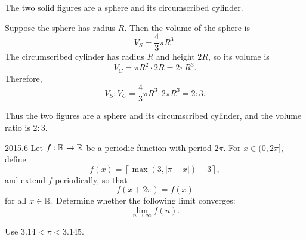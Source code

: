     \begin{solution}
        The two solid figures are a sphere and its circumscribed cylinder.

        Suppose the sphere has radius $R$. Then the volume of the sphere is
        \[
            V_S=\frac{4}{3}\pi R^3.
        \]
        The circumscribed cylinder has radius $R$ and height $2R$, so its volume is
        \[
            V_C=\pi R^2\cdot 2R=2\pi R^3.
        \]
        Therefore,
        \[
            V_S:V_C
            =
            \frac{4}{3}\pi R^3:2\pi R^3
            =
            2:3.
        \]

        Thus the two figures are a sphere and its circumscribed cylinder, and the volume ratio is
        $\boxed{2:3}$.
    \end{solution}

    \begin{pastproblem}{2015.6}
        Let $f:\mathbb{R}\to\mathbb{R}$ be a periodic function with period $2\pi$. For $x\in(0,2\pi]$, define
        \[
            f(x)
            =
            \left\lceil
                \max(3,|\pi-x|)-3
            \right\rceil,
        \]
        and extend $f$ periodically, so that
        \[
            f(x+2\pi)=f(x)
        \]
        for all $x\in\mathbb{R}$. Determine whether the following limit converges:
        \[
            \lim\limits_{n\to\infty} f(n).
        \]

        \begin{hint}
            Use $3.14<\pi<3.145$.
        \end{hint}
    \end{pastproblem}

